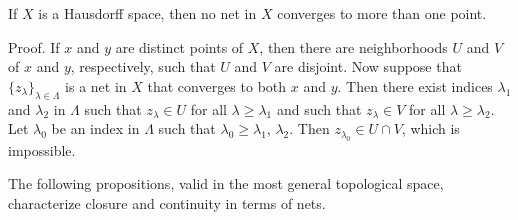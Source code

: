 If $X$ is a Hausdorff space, then no net in $X$ converges to more than one point.

Proof. If $x$ and $y$ are distinct points of $X$, then there are neighborhoods $U$ and $V$ of $x$ and $y$, respectively, such that $U$ and $V$ are disjoint. Now suppose that $\{z_{\lambda}\}_{\lambda \in \Lambda}$ is a net in $X$ that converges to both $x$ and $y$. Then there exist indices $\lambda_1$ and $\lambda_2$ in $\Lambda$ such that $z_{\lambda} \in U$ for all $\lambda \geq \lambda_1$ and such that $z_{\lambda} \in V$ for all $\lambda \geq \lambda_2$. Let $\lambda_0$ be an index in $\Lambda$ such that $\lambda_0 \geq \lambda_1$, $\lambda_2$. Then $z_{\lambda_0} \in U \cap V$, which is impossible.

The following propositions, valid in the most general topological space, characterize closure and continuity in terms of nets.
